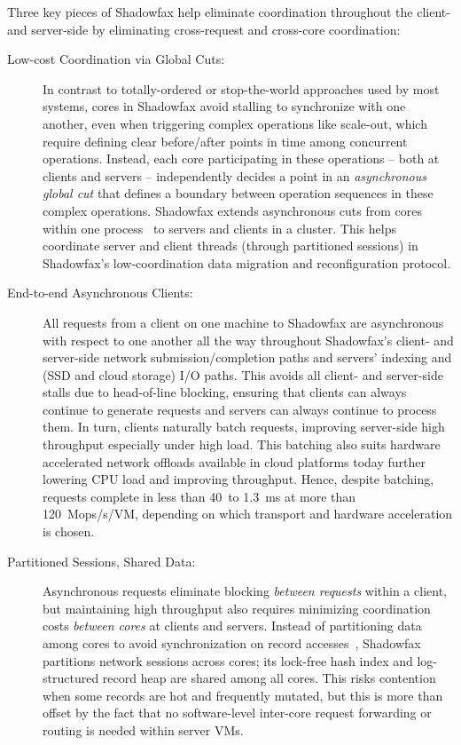 Three key pieces of Shadowfax help
eliminate coordination throughout the client- and server-side by eliminating
cross-request and cross-core coordination:
%
\begin{description}
\item[Low-cost Coordination via Global Cuts:]
%
In contrast to totally-ordered or stop-the-world approaches used by most
systems, cores in Shadowfax avoid stalling to synchronize with one another, even when
triggering complex operations like scale-out, which require
defining clear before/after points in time among concurrent operations.
%
Instead, each core participating in these operations -- both at clients and
servers -- independently decides a point in an \emph{asynchronous global
cut} that defines a boundary between operation sequences in these complex operations.
%
Shadowfax extends asynchronous cuts from cores within one
process~\cite{faster} to servers
and clients in a cluster.
%
This helps coordinate server
and client threads (through partitioned sessions)
in Shadowfax's low-coordination data migration and
reconfiguration protocol.

\item[End-to-end Asynchronous Clients:]
All requests from a client on one machine to Shadowfax are asynchronous with
respect to one another all the way throughout Shadowfax's client- and
server-side network submission/completion paths and servers' indexing and
(SSD and cloud storage) I/O paths.
%
This avoids all client- and server-side stalls due to head-of-line
blocking, ensuring that clients can always continue to generate requests and
servers can always continue to process them.
%
In turn, clients naturally batch requests, improving server-side high
throughput especially under high load.
%
This batching also suits hardware accelerated network offloads available in
cloud platforms today further lowering CPU load and improving throughput.
%
Hence, despite batching, requests complete in less than 40~\us to 1.3~ms at
more than 120~Mops/s/VM, depending on which transport and hardware
acceleration is chosen.

\item[Partitioned Sessions, Shared Data:]
Asynchronous requests eliminate blocking {\em between requests} within a client, but
maintaining high throughput also requires minimizing coordination
costs {\em between cores} at clients and servers.
%
Instead of partitioning data among cores to avoid synchronization on record
accesses~\cite{hstore,voltdb,mica,seastar}, Shadowfax partitions network
sessions across cores; its lock-free hash index and log-structured record heap
are shared among all cores.
%
This risks contention when some records are hot and frequently
mutated, but this is more than offset by the fact that no software-level
inter-core request forwarding or routing is needed within server VMs.

\end{description}

